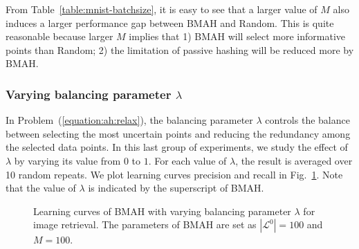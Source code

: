 From Table~\ref{table:mnist-batchsize}, it is easy to see that a larger value of $M$ also induces a larger performance gap between \mbox{BMAH} and \mbox{Random}. This is quite reasonable because larger $M$ implies that 1) \mbox{BMAH} will select more informative points than \mbox{Random}; 2) the limitation of passive hashing will be reduced more by \mbox{BMAH}.

\subsubsection{Varying balancing parameter $\lambda$}
\label{section:comp-lambda-mnist}
In Problem~(\ref{equation:ah:relax}), the balancing parameter $\lambda$ controls the balance between selecting the most uncertain points and reducing the redundancy among the selected data points. In this last group of experiments, we study the effect of $\lambda$ by varying its value from $0$ to $1$. For each value of $\lambda$, the result is averaged over 10 random repeats. We plot learning curves \wrt precision and recall in Fig.~\ref{fig:apt-largemnist-24b-qp}. Note that the value of $\lambda$ is indicated by the superscript of \mbox{BMAH}.


\begin{figure}[htb]
{}
\caption{Learning curves of \mbox{BMAH} with varying balancing parameter $\lambda$ for image retrieval. The parameters of \mbox{BMAH} are set as $|\mathcal{L}^{0}|=100$ and $M = 100$.}
\label{fig:apt-largemnist-24b-qp}
\end{figure}

